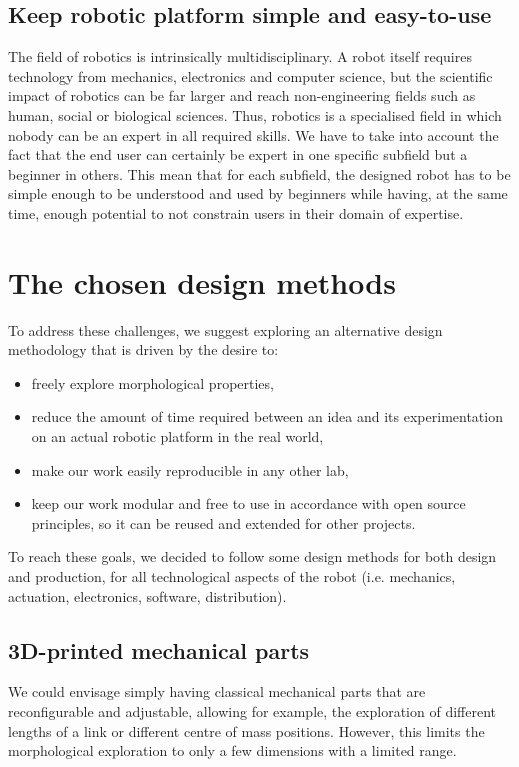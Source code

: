 \subsection{Keep robotic platform simple and easy-to-use} %

The field of robotics is intrinsically multidisciplinary. A robot itself requires technology from mechanics, electronics and computer science, but the scientific impact of robotics can be far larger and reach non-engineering fields such as human, social or biological sciences. Thus, robotics is a specialised field  in which nobody can be an expert in all required skills.
We have to take into account the fact that the end user can certainly be expert in one specific subfield but a beginner in others. This mean that for each subfield, the designed robot has to be simple enough to be understood and used by beginners while having, at the same time, enough potential to not constrain users in their domain of expertise.



\section{The chosen design methods} %

To address these challenges, we suggest exploring an alternative design methodology that is driven by the desire to:
\begin{itemize}
    \item freely explore morphological properties,
    \item reduce the amount of time required between an idea and its experimentation on an actual robotic platform in the real world,
    \item make our work easily reproducible in any other lab,
    \item keep our work modular and free to use in accordance with open source principles, so it can be reused and extended for other projects.
\end{itemize}


To reach these goals, we decided to follow some design methods for both design and production, for all technological aspects of the robot (i.e. mechanics, actuation, electronics, software, distribution).

\subsection{3D-printed mechanical parts} %
We could envisage simply having classical mechanical parts that are reconfigurable and adjustable, allowing for example, the exploration of different lengths of a link or different centre of mass positions. However, this limits the morphological exploration to only a few dimensions with a limited range.


